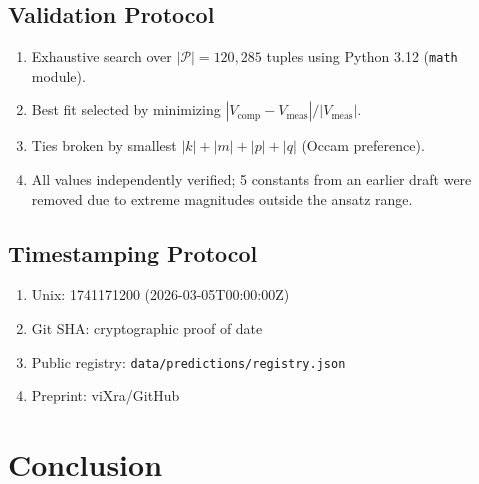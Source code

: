 \documentclass[aps,prd,preprint,superscriptaddress,showpacs,nofootinbib,longbibliography]{revtex4-2}
\begin{document}
\subsection{Validation Protocol}
\begin{enumerate}[itemsep=2pt]
    \item Exhaustive search over $|\mathcal{P}| = 120{,}285$ tuples using Python 3.12 (\texttt{math} module).
    \item Best fit selected by minimizing $|V_\text{comp} - V_\text{meas}|/|V_\text{meas}|$.
    \item Ties broken by smallest $|k| + |m| + |p| + |q|$ (Occam preference).
    \item All values independently verified; 5 constants from an earlier draft were removed due to extreme magnitudes outside the ansatz range.
\end{enumerate}

\subsection{Timestamping Protocol}
\begin{enumerate}[itemsep=2pt]
    \item Unix: 1741171200 (2026-03-05T00:00:00Z)
    \item Git SHA: cryptographic proof of date
    \item Public registry: \texttt{data/predictions/registry.json}
    \item Preprint: viXra/GitHub
\end{enumerate}

\section{Conclusion}
\label{sec:conclusion}
\end{document}
